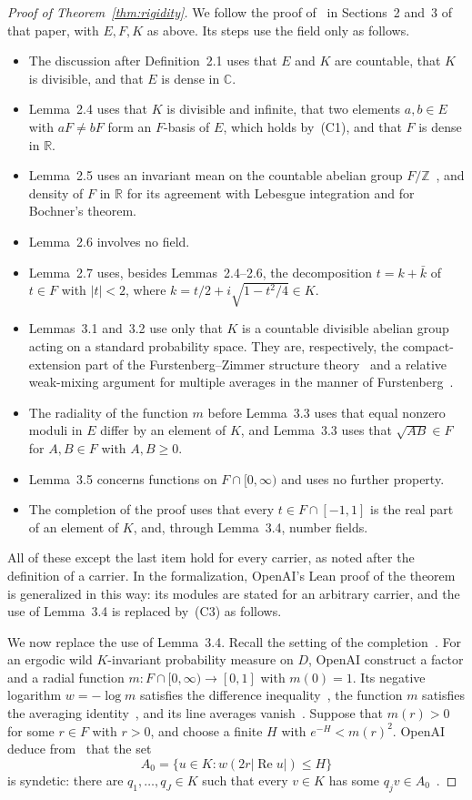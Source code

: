 \documentclass[10pt]{article}
\theoremstyle{remark}
\newcommand{\C}{\mathbb C}
\newcommand{\R}{\mathbb R}
\newcommand{\Z}{\mathbb Z}
\DeclareMathOperator{\re}{Re}
\begin{document}
\begin{proof}[Proof of Theorem~\ref{thm:rigidity}]
We follow the proof of~\cite[Theorem~2.3]{OAI} in Sections~2 and~3 of that paper, with $E,F,K$ as above. Its steps use the field only as follows.
\begin{itemize}
\item The discussion after Definition~2.1 uses that $E$ and $K$ are countable, that $K$ is divisible, and that $E$ is dense in $\C$.
\item Lemma~2.4 uses that $K$ is divisible and infinite, that two elements $a,b\in E$ with $aF\ne bF$ form an $F$-basis of $E$, which holds by~(C1), and that $F$ is dense in $\R$.
\item Lemma~2.5 uses an invariant mean on the countable abelian group $F/\Z$~\cite{vonNeumann,Folner}, and density of $F$ in $\R$ for its agreement with Lebesgue integration and for Bochner's theorem.
\item Lemma~2.6 involves no field.
\item Lemma~2.7 uses, besides Lemmas~2.4--2.6, the decomposition $t=k+\bar k$ of $t\in F$ with $|t|<2$, where $k=t/2+i\sqrt{1-t^2/4}\in K$.
\item Lemmas~3.1 and~3.2 use only that $K$ is a countable divisible abelian group acting on a standard probability space. They are, respectively, the compact-extension part of the Furstenberg--Zimmer structure theory~\cite{Furstenberg,ZimmerExt,ZimmerSpectrum,Jamneshan} and a relative weak-mixing argument for multiple averages in the manner of Furstenberg~\cite{Furstenberg}.
\item The radiality of the function $m$ before Lemma~3.3 uses that equal nonzero moduli in $E$ differ by an element of $K$, and Lemma~3.3 uses that $\sqrt{AB}\in F$ for $A,B\in F$ with $A,B\ge0$.
\item Lemma~3.5 concerns functions on $F\cap[0,\infty)$ and uses no further property.
\item The completion of the proof uses that every $t\in F\cap[-1,1]$ is the real part of an element of $K$, and, through Lemma~3.4, number fields.
\end{itemize}
All of these except the last item hold for every carrier, as noted after the definition of a carrier. In the formalization, OpenAI's Lean proof of the theorem is generalized in this way: its modules are stated for an arbitrary carrier, and the use of Lemma~3.4 is replaced by~(C3) as follows.

We now replace the use of Lemma~3.4. Recall the setting of the completion~\cite[Section~3]{OAI}. For an ergodic wild $K$-invariant probability measure on $D$, OpenAI construct a factor and a radial function $m\colon F\cap[0,\infty)\to[0,1]$ with $m(0)=1$. Its negative logarithm $w=-\log m$ satisfies the difference inequality~\cite[(3.12)]{OAI}, the function $m$ satisfies the averaging identity~\cite[(3.13)]{OAI}, and its line averages vanish~\cite[(2.4) and~(3.11)]{OAI}. Suppose that $m(r)>0$ for some $r\in F$ with $r>0$, and choose a finite $H$ with $e^{-H}<m(r)^2$. OpenAI deduce from~\cite[(3.13)]{OAI} that the set
\[
 A_0=\{u\in K:w(2r|\re u|)\le H\}
\]
is syndetic: there are $q_1,\ldots,q_J\in K$ such that every $v\in K$ has some $q_jv\in A_0$~\cite[(3.16)]{OAI}.


\end{proof}
\end{document}
